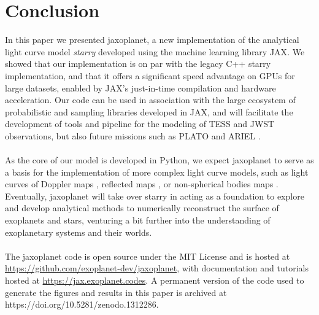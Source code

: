 \documentclass[modern]{aastex631}
\begin{document}
\section{Conclusion}
In this paper we presented \textsf{jaxoplanet}, a new implementation of the analytical light curve model \textit{starry} developed using the machine learning library \textsf{JAX}. We showed that our implementation is on par with the legacy C++ \textsf{starry} implementation, and that it offers a significant speed advantage on GPUs for large datasets, enabled by \textsf{JAX}'s just-in-time compilation and hardware acceleration. Our code can be used in association with the large ecosystem of probabilistic and sampling libraries developed in \textsf{JAX}, and will facilitate the development of tools and pipeline for the modeling of TESS and JWST observations, but also future missions such as PLATO \citep{Rauer2014} and ARIEL \citep{Tinetti2018}.\\\\
As the core of our model is developed in Python, we expect \textsf{jaxoplanet} to serve as a basis for the implementation of more complex light curve models, such as light curves of Doppler maps \citep{Luger2021c}, reflected maps \citep{Luger2022}, or non-spherical bodies maps \citep{Dholakia2024}. Eventually, \textsf{jaxoplanet} will take over \textsf{starry} in acting as a foundation to explore and develop analytical methods to numerically reconstruct the surface of exoplanets and stars, venturing a bit further into the understanding of exoplanetary systems and their worlds.\\\\
The \textsf{jaxoplanet} code is open source under the MIT License and is hosted at \href{https://github.com/exoplanet-dev/jaxoplanet/}{https://github.com/exoplanet-dev/jaxoplanet}, with documentation and tutorials hosted at \href{https://jax.exoplanet.codes}{https://jax.exoplanet.codes}. A permanent version of the code used to generate the figures and results in this paper is archived at https://doi.org/10.5281/zenodo.1312286.




\appendix
\end{document}
